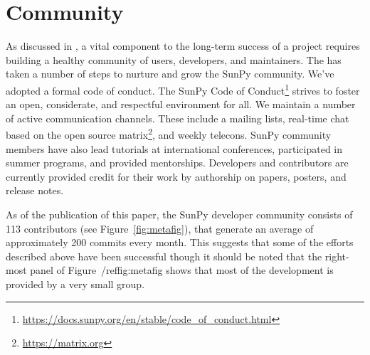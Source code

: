 \section{Community}
\label{sec:community}

As discussed in \citet{bangerth2013}, a vital component to the long-term success of a project requires building a healthy community of users, developers, and maintainers.
The \sunpyproj has taken a number of steps to nurture and grow the SunPy community.
We've adopted a formal code of conduct. 
The SunPy Code of Conduct\footnote{\url{https://docs.sunpy.org/en/stable/code_of_conduct.html}} strives to foster an open, considerate, and respectful environment for all.
We maintain a number of active communication channels.
These include a mailing lists, real-time chat based on the open source matrix\footnote{\url{https://matrix.org}}, and weekly telecons.
SunPy community members have also lead tutorials at international conferences, participated in summer programs, and provided mentorships.
Developers and contributors are currently provided credit for their work by authorship on papers, posters, and release notes.

As of the publication of this paper, the SunPy developer community consists of 113 contributors (see Figure~\ref{fig:metafig}), that generate an average of approximately 200 commits every month.
This suggests that some of the efforts described above have been successful though it should be noted that the right-most panel of Figure~/ref{fig:metafig} shows that most of the development is provided by a very small group.